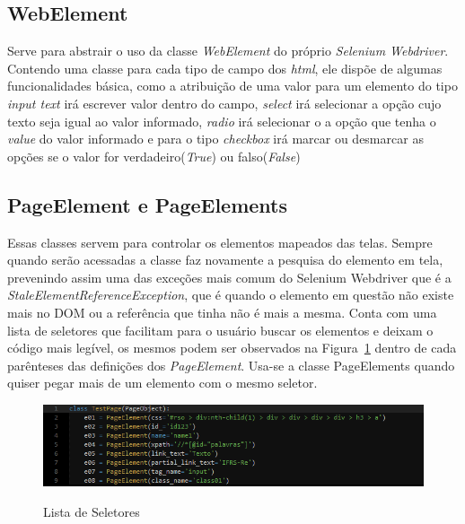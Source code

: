         \subsection{WebElement}
            Serve para abstrair o uso da classe \emph{WebElement} do próprio \emph{Selenium Webdriver}. Contendo uma classe para cada tipo de campo dos \emph{html},
            ele dispõe de algumas funcionalidades básica, como a atribuição de uma valor para um elemento do tipo \emph{input text} irá escrever
            valor dentro do campo, \emph{select} irá selecionar a opção cujo texto seja igual ao valor informado, \emph{radio} irá selecionar o
            a opção que tenha o \emph{value} do valor informado e para o tipo \emph{checkbox} irá marcar ou desmarcar as opções se o valor for
            verdadeiro(\emph{True}) ou falso(\emph{False})

        \subsection{PageElement e PageElements}
        \label{PageElement}
            Essas classes servem para controlar os elementos mapeados das telas. Sempre quando serão acessadas a classe faz novamente a pesquisa
            do elemento em tela, prevenindo assim uma das exceções mais comum do Selenium Webdriver que é a \emph{StaleElementReferenceException},
            que é quando o elemento em questão não existe mais no DOM ou a referência que tinha não é mais a mesma. Conta com uma lista de seletores
            que facilitam para o usuário buscar os elementos e deixam o código mais legível, os mesmos podem ser observados na Figura~\ref{fig:selectors}
            dentro de cada parênteses das definições dos \emph{PageElement}.
            Usa-se a classe PageElements quando quiser pegar mais de um elemento com o mesmo seletor.


            \begin{figure}[H]
                \vspace*{0,3cm}
                \centering
                \caption{Lista de Seletores}
                \includegraphics[width=1\textwidth]{./04-figuras/selectors}
                \label{fig:selectors}
            \end{figure}
            \vspace*{-0,9cm}
            {\raggedright {}}

